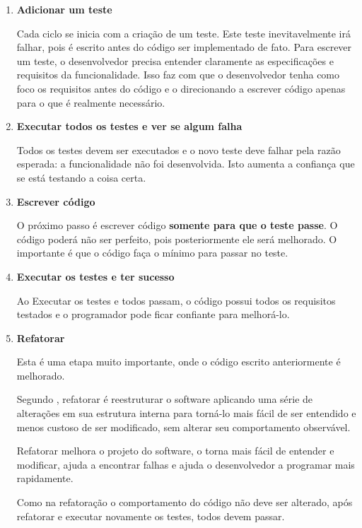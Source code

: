 \begin{enumerate}
\item \textbf{Adicionar um teste}

Cada ciclo se inicia com a criação de um teste. Este teste inevitavelmente irá falhar, pois é escrito antes do código ser implementado de fato. Para escrever um teste, o desenvolvedor precisa entender claramente as especificações e requisitos da funcionalidade. Isso faz com que o desenvolvedor tenha como foco os requisitos antes do código e o direcionando a escrever código apenas para o que é realmente necessário.

\item \textbf{Executar todos os testes e ver se algum falha}

Todos os testes devem ser executados e o novo teste deve falhar pela razão esperada: a funcionalidade não foi desenvolvida. Isto aumenta a confiança que se está testando a coisa certa.

\item \textbf{Escrever código}

O próximo passo é escrever código \textbf{somente para que o teste passe}. O código poderá não ser perfeito, pois posteriormente ele será melhorado. O importante é que o código faça o mínimo para passar no teste.

\item \textbf{Executar os testes e ter sucesso}

Ao Executar os testes e todos passam, o código possui todos os requisitos testados e o programador pode ficar confiante para melhorá-lo.

\item \textbf{Refatorar}

Esta é uma etapa muito importante, onde o código escrito anteriormente é melhorado.

Segundo , refatorar é reestruturar o software aplicando uma série de alterações em sua estrutura interna para torná-lo mais fácil de ser entendido e menos custoso de ser modificado, sem alterar seu comportamento observável.

Refatorar melhora o projeto do software, o torna mais fácil de entender e modificar, ajuda a encontrar falhas e ajuda o desenvolvedor a programar mais rapidamente.

Como na refatoração o comportamento do código não deve ser alterado, após refatorar e executar novamente os testes, todos devem passar.

\end{enumerate}

